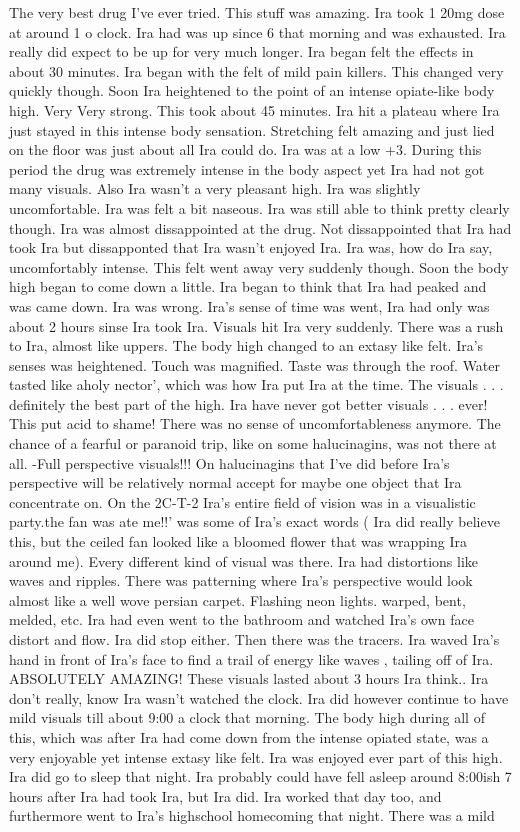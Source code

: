 \documentclass[12pt]{book}
\begin{document}
The very best drug I've ever tried. This stuff was amazing. Ira took 1 20mg dose at around 1 o clock. Ira had was up since 6 that morning and was exhausted. Ira really did expect to be up for very much longer. Ira began felt the effects in about 30 minutes. Ira began with the felt of mild pain killers. This changed very quickly though. Soon Ira heightened to the point of an intense opiate-like body high. Very Very strong. This took about 45 minutes. Ira hit a plateau where Ira just stayed in this intense body sensation. Stretching felt amazing and just lied on the floor was just about all Ira could do. Ira was at a low +3. During this period the drug was extremely intense in the body aspect yet Ira had not got many visuals. Also Ira wasn't a very pleasant high. Ira was slightly uncomfortable. Ira was felt a bit naseous. Ira was still able to think pretty clearly though. Ira was almost dissappointed at the drug. Not dissappointed that Ira had took Ira but dissapponted that Ira wasn't enjoyed Ira. Ira was, how do Ira say, uncomfortably intense. This felt went away very suddenly though. Soon the body high began to come down a little. Ira began to think that Ira had peaked and was came down. Ira was wrong. Ira's sense of time was went, Ira had only was about 2 hours sinse Ira took Ira. Visuals hit Ira very suddenly. There was a rush to Ira, almost like uppers. The body high changed to an extasy like felt. Ira's senses was heightened. Touch was magnified. Taste was through the roof. Water tasted like aholy nector', which was how Ira put Ira at the time. The visuals . . .  definitely the best part of the high. Ira have never got better visuals . . .  ever! This put acid to shame! There was no sense of uncomfortableness anymore. The chance of a fearful or paranoid trip, like on some halucinagins, was not there at all. -Full perspective visuals!!! On halucinagins that I've did before Ira's perspective will be relatively normal accept for maybe one object that Ira concentrate on. On the 2C-T-2 Ira's entire field of vision was in a visualistic party.the fan was ate me!!' was some of Ira's exact words ( Ira did really believe this, but the ceiled fan looked like a bloomed flower that was wrapping Ira around me). Every different kind of visual was there. Ira had distortions like waves and ripples. There was patterning where Ira's perspective would look almost like a well wove persian carpet. Flashing neon lights. warped, bent, melded, etc. Ira had even went to the bathroom and watched Ira's own face distort and flow. Ira did stop either. Then there was the tracers. Ira waved Ira's hand in front of Ira's face to find a trail of energy like waves , tailing off of Ira. ABSOLUTELY AMAZING! These visuals lasted about 3 hours Ira think.. Ira don't really, know Ira wasn't watched the clock. Ira did however continue to have mild visuals till about 9:00 a clock that morning. The body high during all of this, which was after Ira had come down from the intense opiated state, was a very enjoyable yet intense extasy like felt. Ira was enjoyed ever part of this high. Ira did go to sleep that night. Ira probably could have fell asleep around 8:00ish 7 hours after Ira had took Ira, but Ira did. Ira worked that day too, and furthermore went to Ira's highschool homecoming that night. There was a mild 
\end{document}
